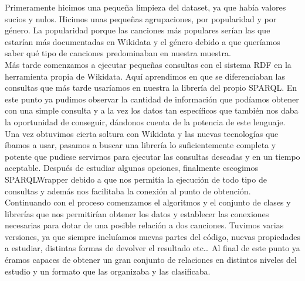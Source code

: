 Primeramente hicimos una pequeña limpieza del dataset, ya que había valores sucios y nulos. Hicimos unas pequeñas agrupaciones, por popularidad y por género. La popularidad porque las canciones más populares serían las que estarían más documentadas en Wikidata y el género debido a que queríamos saber qué tipo de canciones predominaban en nuestra muestra.\\

Más tarde comenzamos a ejecutar pequeñas consultas con el sistema RDF en la herramienta propia de Wikidata. Aquí aprendimos en que se diferenciaban las consultas que más tarde usaríamos en nuestra la librería del propio SPARQL. En este punto ya pudimos observar la cantidad de información que podíamos obtener con una simple consulta y a la vez los datos tan específicos que también nos daba la oportunidad de conseguir, dándonos cuenta de la potencia de este lenguaje.\\

Una vez obtuvimos cierta soltura con Wikidata y las nuevas tecnologías que íbamos a usar, pasamos a buscar una librería lo suficientemente completa y potente que pudiese servirnos para ejecutar las consultas deseadas y en un tiempo aceptable. Después de estudiar algunas opciones, finalmente escogimos SPARQLWrapper debido a que nos permitía la ejecución de todo tipo de consultas y además nos facilitaba la conexión al punto de obtención.\\

Continuando con el proceso comenzamos el algoritmos y el conjunto de clases y librerías que nos permitirían obtener los datos y establecer las conexiones necesarias para dotar de una posible relación a dos canciones. Tuvimos varias versiones, ya que siempre incluíamos nuevas partes del código, nuevas propiedades a estudiar, distintas formas de devolver el resultado etc… Al final de este punto ya éramos capaces de obtener un gran conjunto de relaciones en distintos niveles del estudio y un formato que las organizaba y las clasificaba.\\
